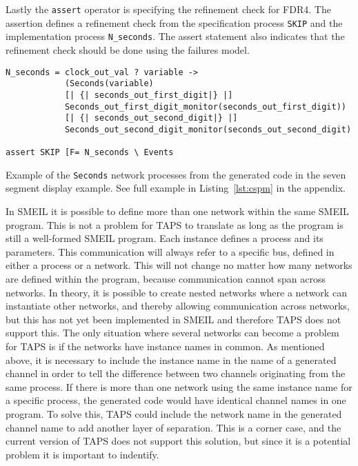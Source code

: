 Lastly the \cspm{} \texttt{assert} operator is specifying the refinement check for FDR4. The assertion defines a refinement check from the specification process \texttt{SKIP} and the implementation process \texttt{N\_seconds}. The assert statement also indicates that the refinement check should be done using the failures model.\\
\begin{listing}
\begin{verbatim}
N_seconds = clock_out_val ? variable ->
            (Seconds(variable)
            [| {| seconds_out_first_digit|} |]
            Seconds_out_first_digit_monitor(seconds_out_first_digit))
            [| {| seconds_out_second_digit|} |]
            Seconds_out_second_digit_monitor(seconds_out_second_digit)

assert SKIP [F= N_seconds \ Events
\end{verbatim}
\caption{Example of the \texttt{Seconds} network processes from the generated \cspm{} code in the seven segment display example. See full example in Listing~\ref{lst:cspm} in the appendix.}
\label{lst:network_example_cspm}
\end{listing}

In SMEIL it is possible to define more than one network within the same SMEIL program. This is not a problem for TAPS to translate as long as the program is still a well-formed SMEIL program. Each instance defines a process and its parameters. This communication will always refer to a specific bus, defined in either a process or a network. This will not change no matter how many networks are defined within the program, because communication cannot span across networks.
In theory, it is possible to create nested networks where a network can instantiate other networks, and thereby allowing communication across networks, but this has not yet been implemented in SMEIL and therefore TAPS does not support this.
The only situation where several networks can become a problem for TAPS is if the networks have instance names in common. As mentioned above, it is necessary to include the instance name in the name of a generated \cspm{} channel in order to tell the difference between two \cspm{} channels originating from the same process. If there is more than one network using the same instance name for a specific process, the generated code would have identical channel names in one \cspm{} program. To solve this, TAPS could include the network name in the generated \cspm{} channel name to add another layer of separation. This is a corner case, and the current version of TAPS does not support this solution, but since it is a potential problem it is important to indentify.

